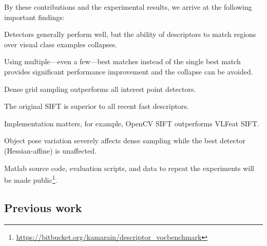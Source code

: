 \documentclass[journal]{IEEEtran}
\begin{document}
By these contributions and the experimental results, we arrive at the following important findings:
\begin{compactitem}
\item Detectors generally perform well, but the ability of descriptors to match
  regions over visual class examples collapses.
\item Using multiple---even a few---best matches instead of the single best match
  provides significant performance improvement and the collapse can be avoided.%
\item Dense grid sampling outperforms all interest point detectors.%
\item The original SIFT is superior to all recent fast descriptors.
\item Implementation matters, for example, OpenCV SIFT outperforms VLFeat SIFT.
\item Object pose variation severely affects dense sampling
  while the best detector (Hessian-affine) is unaffected.
\end{compactitem}
Matlab source code, evaluation scripts, and data to repeat the experiments will be
made public\footnote{\url{https://bitbucket.org/kamarain/descriptor_vocbenchmark}}.

%
\subsection{Previous work}
%
\end{document}

